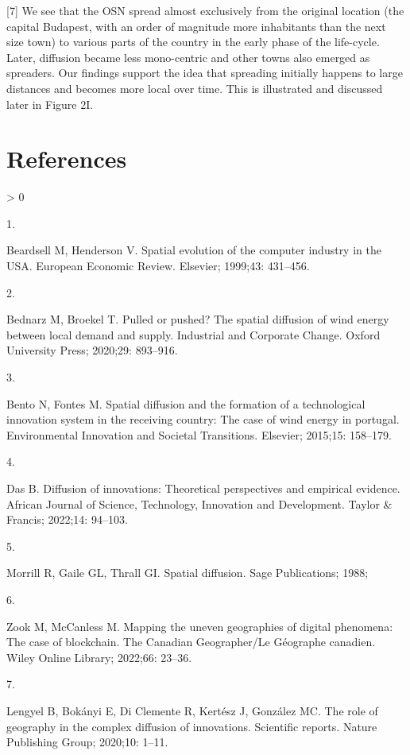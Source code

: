 \documentclass[10pt,letterpaper]{article}
\newlength{\csllabelwidth}
\newlength{\cslhangindent}
\newenvironment{CSLReferences}[2] %
 {%
  \setlength{\parindent}{0pt}
  \ifodd #1 \everypar{\setlength{\hangindent}{\cslhangindent}}\ignorespaces\fi
  \ifnum #2 > 0
  \setlength{\parskip}{#2\baselineskip}
  \fi
 }%
 {}
\newcommand{\CSLLeftMargin}[1]{\parbox[t]{\csllabelwidth}{#1}}
\newcommand{\CSLRightInline}[1]{\parbox[t]{\linewidth - \csllabelwidth}{#1}\break}
\begin{document}
{[}7{]} We see that the OSN spread almost exclusively from the original
location (the capital Budapest, with an order of magnitude more
inhabitants than the next size town) to various parts of the country in
the early phase of the life-cycle. Later, diffusion became less
mono-centric and other towns also emerged as spreaders. Our findings
support the idea that spreading initially happens to large distances and
becomes more local over time. This is illustrated and discussed later in
Figure 2I.

\hypertarget{references}{%
\section*{References}\label{references}}

\hypertarget{refs}{}
\begin{CSLReferences}{0}{0}
\leavevmode\hypertarget{ref-beardsell1999spatial}{}%
\CSLLeftMargin{1. }
\CSLRightInline{Beardsell M, Henderson V. Spatial evolution of the
computer industry in the USA. European Economic Review. Elsevier;
1999;43: 431--456. }

\leavevmode\hypertarget{ref-bednarz2020pulled}{}%
\CSLLeftMargin{2. }
\CSLRightInline{Bednarz M, Broekel T. Pulled or pushed? The spatial
diffusion of wind energy between local demand and supply. Industrial and
Corporate Change. Oxford University Press; 2020;29: 893--916. }

\leavevmode\hypertarget{ref-bento2015spatial}{}%
\CSLLeftMargin{3. }
\CSLRightInline{Bento N, Fontes M. Spatial diffusion and the formation
of a technological innovation system in the receiving country: The case
of wind energy in portugal. Environmental Innovation and Societal
Transitions. Elsevier; 2015;15: 158--179. }

\leavevmode\hypertarget{ref-das2022diffusion}{}%
\CSLLeftMargin{4. }
\CSLRightInline{Das B. Diffusion of innovations: Theoretical
perspectives and empirical evidence. African Journal of Science,
Technology, Innovation and Development. Taylor \& Francis; 2022;14:
94--103. }

\leavevmode\hypertarget{ref-morrill2020spatial}{}%
\CSLLeftMargin{5. }
\CSLRightInline{Morrill R, Gaile GL, Thrall GI. Spatial diffusion. Sage
Publications; 1988; }

\leavevmode\hypertarget{ref-zook2022mapping}{}%
\CSLLeftMargin{6. }
\CSLRightInline{Zook M, McCanless M. Mapping the uneven geographies of
digital phenomena: The case of blockchain. The Canadian Geographer/Le
G{é}ographe canadien. Wiley Online Library; 2022;66: 23--36. }

\leavevmode\hypertarget{ref-lengyel2020role}{}%
\CSLLeftMargin{7. }
\CSLRightInline{Lengyel B, Bokányi E, Di Clemente R, Kertész J, González
MC. The role of geography in the complex diffusion of innovations.
Scientific reports. Nature Publishing Group; 2020;10: 1--11. }

\end{CSLReferences}

\nolinenumbers
\end{document}
